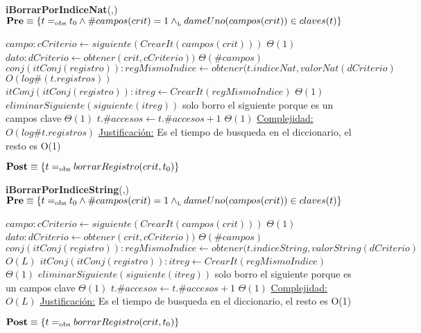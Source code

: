 \begin{algorithm}[H]{\textbf{iBorrarPorIndiceNat}(,)}
	{\\ $\textbf{Pre} \equiv \{t =_{\mathrm{obs}} t_0 \land \#campos(crit) = 1 \land_{\mathrm{\scriptscriptstyle{L}}} dameUno(campos(crit)) \in claves(t)\}$}
	\begin{algorithmic}[1]
		\State $campo: cCriterio \gets siguiente(CrearIt(campos(crit)))$ \Comment $\Theta(1)$
		\State $dato: dCriterio \gets obtener(crit,cCriterio))$	\Comment $\Theta(\#campos)$
		\State $conj(itConj(registro)): regMismoIndice \gets obtener(t.indiceNat,valorNat(dCriterio)$ \Comment $O(log \#(t.registros))$
		\State $itConj(itConj(registro)): itreg \gets CrearIt(regMismoIndice)$ \Comment $\Theta(1)$
		\State $eliminarSiguiente(siguiente(itreg))$	\Comment solo borro el siguiente porque es un campos clave $\Theta(1)$
		\State $t.\#accesos \gets t.\#accesos + 1$ \Comment $\Theta(1)$
		\medskip
		\Statex \underline{Complejidad:} $O(log \#t.registros)$
		\Statex \underline{Justificación:} Es el tiempo de busqueda en el diccionario, el resto es O(1) 
	\end{algorithmic}
	{$\textbf{Post} \equiv \{t =_{\mathrm{obs}} borrarRegistro(crit,t_0)\}$}
\end{algorithm}

\begin{algorithm}[H]{\textbf{iBorrarPorIndiceString}(,)}
	{\\ $\textbf{Pre} \equiv \{t =_{\mathrm{obs}} t_0 \land \#campos(crit) = 1 \land_{\mathrm{\scriptscriptstyle{L}}} dameUno(campos(crit)) \in claves(t)\}$}
	\begin{algorithmic}[1]
		\State $campo: cCriterio \gets siguiente(CrearIt(campos(crit)))$ \Comment $\Theta(1)$
		\State $dato: dCriterio \gets obtener(crit,cCriterio))$	\Comment $\Theta(\#campos)$
		\State $conj(itConj(registro)): regMismoIndice \gets obtener(t.indiceString,valorString(dCriterio)$ \Comment $O(L)$
		\State $itConj(itConj(registro)): itreg \gets CrearIt(regMismoIndice)$ \Comment $\Theta(1)$
		\State $eliminarSiguiente(siguiente(itreg))$	\Comment solo borro el siguiente porque es un campos clave $\Theta(1)$
		\State $t.\#accesos \gets t.\#accesos + 1$ \Comment $\Theta(1)$
		\medskip
		\Statex \underline{Complejidad:} $O(L)$
		\Statex \underline{Justificación:} Es el tiempo de busqueda en el diccionario, el resto es O(1)
	\end{algorithmic}
	{$\textbf{Post} \equiv \{t =_{\mathrm{obs}} borrarRegistro(crit,t_0)\}$}
\end{algorithm}

